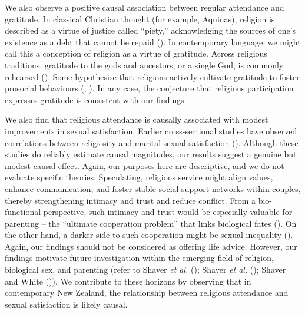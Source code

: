 \documentclass[
  single column]{article}
\begin{document}
We also observe a positive causal association between regular attendance
and gratitude. In classical Christian thought (for example, Aquinas),
religion is described as a virtue of justice called ``piety,''
acknowledging the sources of one's existence as a debt that cannot be
repaid (). In
contemporary language, we might call this a conception of religion as a
virtue of gratitude. Across religious traditions, gratitude to the gods
and ancestors, or a single God, is commonly rehearsed
(). Some
hypothesise that religions actively cultivate gratitude to foster
prosocial behaviours (; ). In any case, the conjecture that religious participation
expresses gratitude is consistent with our findings.

We also find that religious attendance is causally associated with
modest improvements in sexual satisfaction. Earlier cross-sectional
studies have observed correlations between religiosity and marital
sexual satisfaction (). Although these studies do reliably estimate causal magnitudes,
our results suggest a genuine but modest causal effect. Again, our
purposes here are descriptive, and we do not evaluate specific theories.
Speculating, religious service might align values, enhance
communication, and foster stable social support networks within couples,
thereby strengthening intimacy and trust and reduce conflict. From a
bio-functional perspective, such intimacy and trust would be especially
valuable for parenting -- the ``ultimate cooperation problem'' that
links biological fates (). On the other hand, a darker side to such cooperation might
be sexual inequality (). Again, our findings should not be considered as offering
life advice. However, our findings motivate future investigation within
the emerging field of religion, biological sex, and parenting (refer to
Shaver \emph{et al.} (); Shaver
\emph{et al.} (); Shaver and
White ()). We contribute to
these horizons by observing that in contemporary New Zealand, the
relationship between religious attendance and sexual satisfaction is
likely causal.
\end{document}
